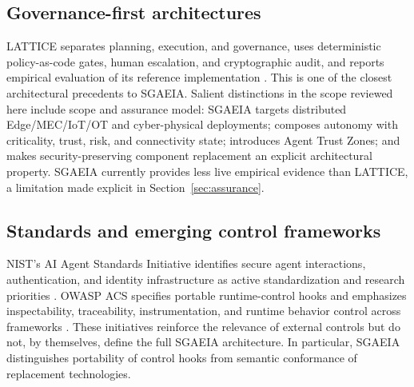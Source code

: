 \documentclass[11pt]{article}
\newcommand{\sgaeia}{\textsc{SGAEIA}}
\begin{document}
\subsection{Governance-first architectures}
LATTICE separates planning, execution, and governance, uses deterministic policy-as-code gates, human escalation, and cryptographic audit, and reports empirical evaluation of its reference implementation \cite{calboreanu2026lattice}. This is one of the closest architectural precedents to \sgaeia{}. Salient distinctions in the scope reviewed here include scope and assurance model: \sgaeia{} targets distributed Edge/MEC/IoT/OT and cyber-physical deployments; composes autonomy with criticality, trust, risk, and connectivity state; introduces Agent Trust Zones; and makes security-preserving component replacement an explicit architectural property. \sgaeia{} currently provides less live empirical evidence than LATTICE, a limitation made explicit in Section~\ref{sec:assurance}.

\subsection{Standards and emerging control frameworks}
NIST's AI Agent Standards Initiative identifies secure agent interactions, authentication, and identity infrastructure as active standardization and research priorities \cite{nist2026agentinitiative,nist2026agentidentity}. OWASP ACS specifies portable runtime-control hooks and emphasizes inspectability, traceability, instrumentation, and runtime behavior control across frameworks \cite{owasp2026acs}. These initiatives reinforce the relevance of external controls but do not, by themselves, define the full \sgaeia{} architecture. In particular, \sgaeia{} distinguishes portability of control hooks from semantic conformance of replacement technologies.
\end{document}
